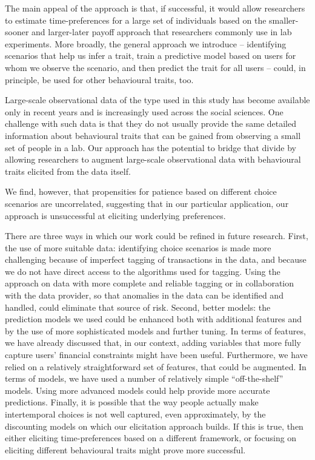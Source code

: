 The main appeal of the approach is that, if successful, it would allow
researchers to estimate time-preferences for a large set of individuals based
on the smaller-sooner and larger-later payoff approach that researchers
commonly use in lab experiments. More broadly, the general approach we
introduce -- identifying scenarios that help us infer a trait, train a predictive model based on users for whom we observe the scenario, and then predict the trait for all users -- could, in principle, be used for other behavioural traits, too.

Large-scale observational data of the type used in this study has
become available only in recent years and is increasingly used across the
social sciences. One challenge with such data is that they do not usually
provide the same detailed information about behavioural traits that can be gained
from observing a small set of people in a lab. Our approach has the potential
to bridge that divide by allowing researchers to augment large-scale
observational data with behavioural traits elicited from the data itself.

We find, however, that propensities for patience based on different choice
scenarios are uncorrelated, suggesting that in our particular application, our
approach is unsuccessful at eliciting underlying preferences.

There are three
ways in which our work could be refined in future research. First, the use of more suitable data: identifying
choice scenarios is made more challenging because of imperfect tagging of
transactions in the data, and because we do not have direct access to the
algorithms used for tagging. Using the approach on data with more complete and
reliable tagging or in collaboration with the data provider, so that anomalies
in the data can be identified and handled, could eliminate that source of risk.
Second, better models: the prediction models we used could be enhanced both with additional
features and by the use of more sophisticated models and further tuning. In
terms of features, we have already discussed that, in our context, adding
variables that more fully capture users' financial constraints might have been
useful. Furthermore, we have relied on a relatively straightforward set of
features, that could be augmented. In terms of models, we have used a
number of relatively simple ``off-the-shelf'' models. Using more advanced
models could help provide more accurate predictions. Finally, it is possible
that the way people actually make intertemporal choices is not well
captured, even approximately, by the discounting models on which our
elicitation approach builds. If this is true, then either eliciting
time-preferences based on a different framework, or focusing on eliciting
different behavioural traits might prove more successful.

